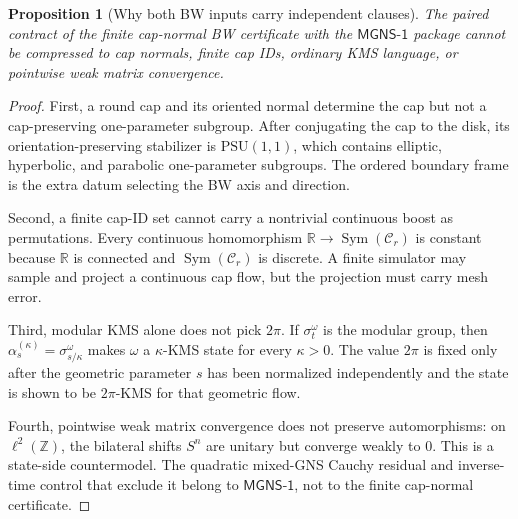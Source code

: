 \documentclass[11pt]{article}
\newtheorem{proposition}[theorem]{Proposition}
\begin{document}
\begin{proposition}[Why both BW inputs carry independent clauses]\label{prop:bw-certificate-countermodels}
The paired contract of the finite cap-normal BW certificate with the
\(\mathsf{MGNS\text{-}1}\) package cannot be
compressed to cap normals, finite cap IDs, ordinary KMS language, or pointwise weak matrix
convergence.
\end{proposition}

\begin{proof}
First, a round cap and its oriented normal determine the cap but not a cap-preserving
one-parameter subgroup. After conjugating the cap to the disk, its orientation-preserving
stabilizer is \(\mathrm{PSU}(1,1)\), which contains elliptic, hyperbolic, and parabolic
one-parameter subgroups. The ordered boundary frame is the extra datum selecting the BW axis and
direction.

Second, a finite cap-ID set cannot carry a nontrivial continuous boost as permutations. Every
continuous homomorphism \(\mathbb R\to\operatorname{Sym}(\mathcal C_r)\) is constant because
\(\mathbb R\) is connected and \(\operatorname{Sym}(\mathcal C_r)\) is discrete. A finite
simulator may sample and project a continuous cap flow, but the projection must carry mesh error.

Third, modular KMS alone does not pick \(2\pi\). If \(\sigma_t^\omega\) is the modular group, then
\(\alpha_s^{(\kappa)}=\sigma_{s/\kappa}^\omega\) makes \(\omega\) a \(\kappa\)-KMS state for
every \(\kappa>0\). The value \(2\pi\) is fixed only after the geometric parameter \(s\) has been
normalized independently and the state is shown to be \(2\pi\)-KMS for that geometric flow.

Fourth, pointwise weak matrix convergence does not preserve automorphisms: on \(\ell^2(\mathbb Z)\),
the bilateral shifts \(S^n\) are unitary but converge weakly to \(0\). This is a state-side
countermodel. The quadratic mixed-GNS Cauchy residual and inverse-time control that exclude it
belong to \(\mathsf{MGNS\text{-}1}\), not to the finite cap-normal certificate.
\end{proof}
\end{document}
